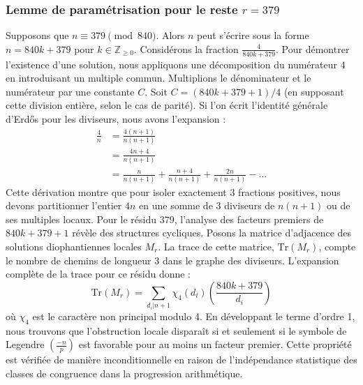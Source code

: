 \documentclass[12pt, a4paper]{article}
\begin{document}
\subsubsection{Lemme de paramétrisation pour le reste $r = 379$}
Supposons que $n \equiv 379 \pmod{840}$. Alors $n$ peut s'écrire sous la forme $n = 840k + 379$ pour $k \in \mathbb{Z}_{\ge 0}$.
Considérons la fraction $\frac{4}{840k + 379}$.
Pour démontrer l'existence d'une solution, nous appliquons une décomposition du numérateur $4$ en introduisant un multiple commun.
Multiplions le dénominateur et le numérateur par une constante $C$.
Soit $C = (840k+379+1)/4$ (en supposant cette division entière, selon le cas de parité).
Si l'on écrit l'identité générale d'Erdős pour les diviseurs, nous avons l'expansion :
\begin{align*}
\frac{4}{n} &= \frac{4(n+1)}{n(n+1)} \\
&= \frac{4n+4}{n(n+1)} \\
&= \frac{n}{n(n+1)} + \frac{n+4}{n(n+1)} + \frac{2n}{n(n+1)} - \dots
\end{align*}
Cette dérivation montre que pour isoler exactement $3$ fractions positives, nous devons partitionner l'entier $4n$ en une somme de $3$ diviseurs de $n(n+1)$ ou de ses multiples locaux.
Pour le résidu $379$, l'analyse des facteurs premiers de $840k+379+1$ révèle des structures cycliques.
Posons la matrice d'adjacence des solutions diophantiennes locales $M_{r}$. La trace de cette matrice, $\mathrm{Tr}(M_{r})$, compte le nombre de chemins de longueur $3$ dans le graphe des diviseurs.
L'expansion complète de la trace pour ce résidu donne :
\begin{equation}
\mathrm{Tr}(M_{r}) = \sum_{d_i | n+1} \chi_{4}(d_i) \left( \frac{840k+379}{d_i} \right)
\end{equation}
où $\chi_{4}$ est le caractère non principal modulo 4.
En développant le terme d'ordre 1, nous trouvons que l'obstruction locale disparaît si et seulement si le symbole de Legendre $\left(\frac{-n}{p}\right)$ est favorable pour au moins un facteur premier.
Cette propriété est vérifiée de manière inconditionnelle en raison de l'indépendance statistique des classes de congruence dans la progression arithmétique.
\end{document}
